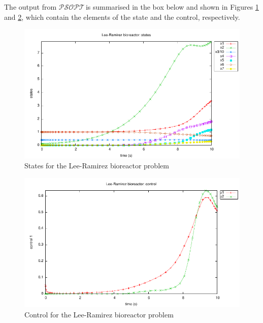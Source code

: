 \documentclass[a4paper,11pt]{report}    %
\newcommand{\psopt}{$\mathcal{PSOPT}$\,}  %
\newenvironment{shadedframe}{%
  \def\FrameCommand{\fcolorbox{black}{shadecolor}}%
  \MakeFramed {\FrameRestore}}
{\endMakeFramed}
\begin{document}
\tiny
\begin{shadedframe}

\end{shadedframe}
\normalsize

The output from \psopt is summarised in the box below and shown in Figures \ref{fig:bioreactor_states} and \ref{fig:bioreactor_control}, which contain the elements
of the state and the control, respectively.

\begin{shadedframe}

\end{shadedframe}

\begin{figure}
  \centering 
  \includegraphics{../examples/bioreactor/bioreactor_states}
  \caption{States for the Lee-Ramirez bioreactor problem}
 \label{fig:bioreactor_states}
\end{figure}


\begin{figure}
  \centering
  \includegraphics{../examples/bioreactor/bioreactor_controls}
  \caption{Control for the Lee-Ramirez bioreactor problem}
 \label{fig:bioreactor_control}
\end{figure}
\end{document}
